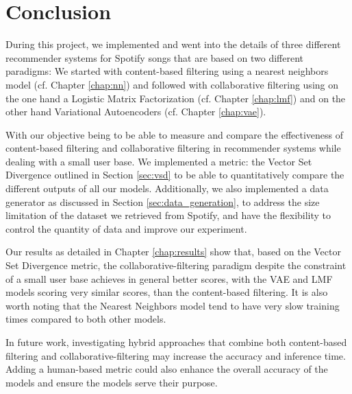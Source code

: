 \chapter{Conclusion}

During this project, we implemented and went into the details of three different recommender systems for Spotify songs that are based on two different paradigms:  We started with content-based filtering using a nearest neighbors model (cf. Chapter \ref{chap:nn}) and followed with collaborative filtering using on the one hand a Logistic Matrix Factorization (cf. Chapter \ref{chap:lmf}) and on the other hand Variational Autoencoders (cf. Chapter \ref{chap:vae}). 

With our objective being to be able to measure and compare the effectiveness of content-based filtering and collaborative filtering in recommender systems while dealing with a small user base. We implemented a metric: the Vector Set Divergence outlined in Section \ref{sec:vsd} to be able to quantitatively compare the different outputs of all our models. Additionally, we also implemented a data generator as discussed in Section \ref{sec:data_generation}, to address the size limitation of the dataset we retrieved from Spotify, and have the flexibility to control the quantity of data and improve our experiment.


Our results as detailed in Chapter \ref{chap:results} show that, based on the Vector Set Divergence metric, the collaborative-filtering paradigm despite the constraint of a small user base achieves in general better scores, with the VAE and LMF models scoring very similar scores, than the content-based filtering. It is also worth noting that the Nearest Neighbors model tend to have very slow training times compared to both other models.

In future work, investigating hybrid approaches that combine both content-based filtering and collaborative-filtering may increase the accuracy and inference time. Adding a human-based metric could also enhance the overall accuracy of the models and ensure the models serve their purpose.